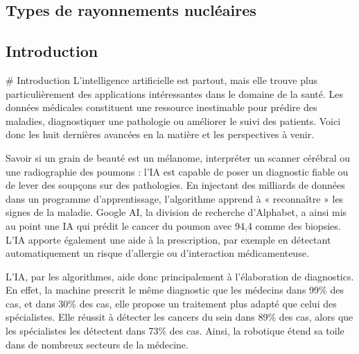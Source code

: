 \begin{titlepage}
	\begin{center}
		\chapter{Types de rayonnements nucléaires}
		\minitoc

		\vspace{5cm}
		\pgfspectra[element=He,absorption]
	\end{center}
	\vfill %
\end{titlepage}
\pagestyle{monstyle}\setcounter{page}{1}

\section{Introduction}

# Introduction
L’intelligence artificielle est partout, mais elle trouve plus particulièrement
des applications intéressantes dans le domaine de la santé. Les données
médicales constituent une ressource inestimable pour prédire des maladies,
diagnostiquer une pathologie ou améliorer le suivi des patients. Voici donc les
huit dernières avancées en la matière et les perspectives à venir.

Savoir si un grain de beauté est un mélanome, interpréter un scanner cérébral
ou une radiographie des poumons : l'IA est capable de poser un diagnostic
fiable ou de lever des soupçons sur des pathologies. En injectant des milliards
de données dans un programme d'apprentissage, l'algorithme  apprend à «
reconnaître » les signes de la maladie. Google AI, la division de recherche
d'Alphabet, a ainsi mis au point une IA qui prédit le cancer du poumon avec
94,4 %
comme des biopsies. L'IA apporte également une aide à la prescription, par
exemple en détectant automatiquement un risque d'allergie ou d’interaction
médicamenteuse.



L’IA, par les algorithmes, aide donc principalement à l’élaboration de
diagnostics. En effet, la machine prescrit le même diagnostic que les médecins
dans 99\% des cas, et dans 30\% des cas, elle propose un traitement plus adapté
que celui des spécialistes. Elle réussit à détecter les cancers du sein dans
89\% des cas, alors que les spécialistes les détectent dans 73\% des cas. 
Ainsi, la robotique étend sa toile dans de nombreux secteurs de la médecine.

